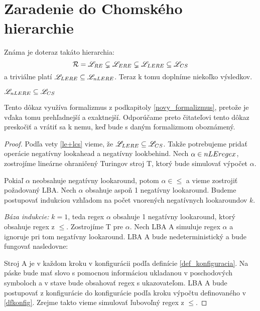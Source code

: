 \section[Chomského hierarchia]{Zaradenie do Chomského hierarchie}

Známa je doteraz takáto hierarchia:
$$ {\cal R} = {\mathscr{L}_{RE}} \subsetneq \mathscr{L}_{ERE} \subsetneq \mathscr{L}_{LERE} \subseteq \mathscr{L}_{CS} $$
a triviálne platí $\mathscr{L}_{LERE} \subseteq \mathscr{L}_{nLERE} $. Teraz k tomu doplníme niekoľko výsledkov.

\begin{veta}
$ \mathscr{L}_{nLERE} \subseteq \mathscr{L}_{CS} $
\end{veta}
Tento dôkaz využíva formalizmus z podkapitoly \ref{novy_formalizmus}, pretože je vďaka tomu prehľadnejší a exaktnejší. Odporúčame preto čitateľovi tento dôkaz preskočiť a vrátiť sa k nemu, keď bude s daným formalizmom oboznámený.
\begin{proof}
Podľa vety \ref{le+lcs} vieme, že $\mathscr{L}_{LERE}\subseteq\mathscr{L}_{CS}$. Takže potrebujeme pridať operácie negatívny lookahead a negatívny lookbehind. Nech $\alpha\in nLEregex$, zostrojíme lineárne ohraničený Turingov stroj T, ktorý bude simulovať výpočet $\alpha$.

Pokiaľ $\alpha$ neobsahuje negatívny lookaround, potom $\alpha\in\le$ a vieme zostrojiť požadovaný LBA. Nech $\alpha$ obsahuje aspoň 1 negatívny lookaround. Budeme postupovať indukciou vzhľadom na počet vnorených negatívnych lookaroundov $k$.

\textit{Báza indukcie:} $k=1$, teda regex $\alpha$ obsahuje 1 negatívny lookaround, ktorý obsahuje regex z $\le$. Zostrojíme T pre $\alpha$. Nech LBA A simuluje regex $\alpha$ a ignoruje pri tom negatívny lookaround. LBA A bude nedeterministický a bude fungovať nasledovne:

Stroj A je v každom kroku v konfigurácii podľa definície \ref{def_konfiguracia}. Na páske bude mať slovo s pomocnou informáciou ukladanou v poschodových symboloch a v stave bude obsahovať regex s ukazovateľom. LBA A bude postupovať z konfigurácie do konfigurácie podľa kroku výpočtu definovaného v \ref{dfkonfig}. Zrejme takto vieme simulovať ľubovoľný regex z $\le$.


\end{proof}
